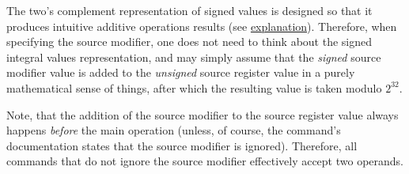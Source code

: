 The two's complement representation of signed values is designed so that it
produces intuitive additive operations results
(see \href{https://en.wikipedia.org/wiki/Two\%27s_complement#Addition}
{explanation}).
Therefore, when specifying the source modifier, one does not need to think about
the signed integral values representation, and may simply assume that
the \textit{signed} source modifier value is added to the \textit{unsigned}
source register value in a purely mathematical sense of things, after which
the resulting value is taken modulo $2^{32}$.

Note, that the addition of the source modifier to the source register value
always happens \textit{before} the main operation (unless, of course,
the command's documentation states that the source modifier is ignored).
Therefore, all  commands that do not ignore the source modifier
effectively accept two  operands.
